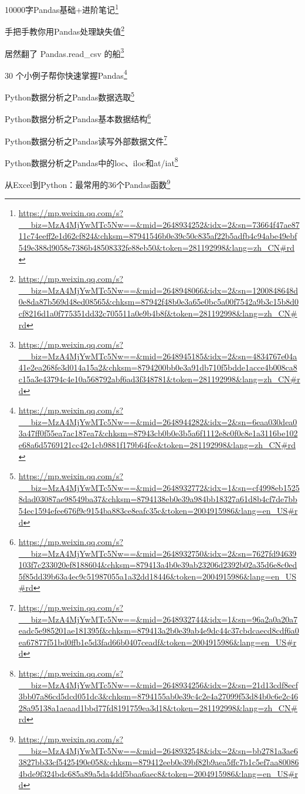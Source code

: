 \documentclass[]{ctexbook}
\renewcommand{\href}[2]{#2\footnote{\url{#1}}}
\begin{document}
\href{https://mp.weixin.qq.com/s?__biz=MzA4MjYwMTc5Nw==\&mid=2648934252\&idx=2\&sn=73664f47ae8711c74eeff2e1d62cf824\&chksm=87941546b0e39c50c835af22b5adfb4c94abe49ebf549e388d9058e7386b48508332fe88eb50\&token=281192998\&lang=zh_CN\#rd}{10000字Pandas基础+进阶笔记}

\href{https://mp.weixin.qq.com/s?__biz=MzA4MjYwMTc5Nw==\&mid=2648948066\&idx=2\&sn=1200848648d0e8da87b569d48ed08565\&chksm=87942f48b0e3a65e0bc5a00f7542a9b3c15b8d0cf8216d1a0f775351dd32c705511a0e9b4b8f\&token=281192998\&lang=zh_CN\#rd}{手把手教你用Pandas处理缺失值}

\href{https://mp.weixin.qq.com/s?__biz=MzA4MjYwMTc5Nw==\&mid=2648945185\&idx=2\&sn=4834767e04a41e2ea268fe3d014a15a2\&chksm=8794200bb0e3a91db710f5bdde1acce4b008ca8c15a3e43794c4e10a568792abf6ad3f348781\&token=281192998\&lang=zh_CN\#rd}{居然翻了 Pandas.read\_csv 的船}

\href{https://mp.weixin.qq.com/s?__biz=MzA4MjYwMTc5Nw==\&mid=2648944282\&idx=2\&sn=6eaa030dea03a47ff0f55ea7ac187ea7\&chksm=87943cb0b0e3b5a6f1112e8c0f0c8e1a3116be102e68a6d5769121cc42c1cb9881f179b64fce\&token=281192998\&lang=zh_CN\#rd}{30 个小例子帮你快速掌握Pandas}

\href{https://mp.weixin.qq.com/s?__biz=MzA4MjYwMTc5Nw==\&mid=2648932772\&idx=1\&sn=cf4998eb15258dad03087ae98549ba37\&chksm=8794138eb0e39a984bb18327a61d8b4cf7de7bb54ec1594efee676f9c9154ba883ce8eafc35c\&token=2004915986\&lang=en_US\#rd}{Python数据分析之Pandas数据选取}

\href{https://mp.weixin.qq.com/s?__biz=MzA4MjYwMTc5Nw==\&mid=2648932750\&idx=2\&sn=7627fd94639103f7c233020ef8188604\&chksm=879413a4b0e39ab23206d2392b02a35d6e8c0ed5f85dd39b63a4ec9c51987055a1a32dd18446\&token=2004915986\&lang=en_US\#rd}{Python数据分析之Pandas基本数据结构}

\href{https://mp.weixin.qq.com/s?__biz=MzA4MjYwMTc5Nw==\&mid=2648932744\&idx=1\&sn=96a2a0a20a7eadc5e985201ae181395f\&chksm=879413a2b0e39ab4e9dc44c37cbdcaecd8cdf6a0ea67877f51bd0ffb1e5d3fad66b0407ceadf\&token=2004915986\&lang=en_US\#rd}{Python数据分析之Pandas读写外部数据文件}

\href{https://mp.weixin.qq.com/s?__biz=MzA4MjYwMTc5Nw==\&mid=2648934256\&idx=2\&sn=21d13cdf8ecf3bb07a86cd5dcd051dc3\&chksm=8794155ab0e39c4c2e4a27099f53d84b0c6e2c4628a95138a1aeaad1bbd77fd8191759ea3d18\&token=281192998\&lang=zh_CN\#rd}{Python数据分析之Pandas中的loc、iloc和at/iat}

\href{https://mp.weixin.qq.com/s?__biz=MzA4MjYwMTc5Nw==\&mid=2648932548\&idx=2\&sn=bb2781a3ae63827bb33cf5425490e058\&chksm=879412eeb0e39bf82b9aea5ffc7b1c5ef7aa800864bde9f324bdc685a89a5da4ddf5baa6aec8\&token=2004915986\&lang=en_US\#rd}{从Excel到Python：最常用的36个Pandas函数}
\end{document}
